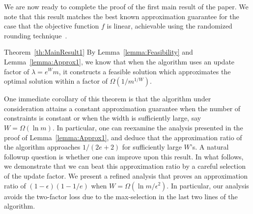 \documentclass[11pt]{article}
\theoremstyle{plain}
\theoremstyle{definition}
\begin{document}
We are now ready to complete the proof of the first main result of
the paper. We note that this result matches the best known
approximation guarantee for the case that the objective function
$f$ is linear, achievable using the randomized rounding
technique~\cite{RaghavanT87,Raghavan88,Srinivasan99}.

\begin{proofof}{Theorem~\ref{th:MainResult1}}
By Lemma~\ref{lemma:Feasibility} and Lemma~\ref{lemma:Approx1}, we
know that when the algorithm uses an update factor of $\lambda =
e^W m$, it constructs a feasible solution which approximates the
optimal solution within a factor of $\Omega(1 / m^{1/W})$.~
\end{proofof}

One immediate corollary of this theorem is that the algorithm
under consideration attains a constant approximation guarantee
when the number of constraints is constant or when the width is
sufficiently large, say $W = \Omega(\ln m)$. In particular, one
can reexamine the analysis presented in the proof of
Lemma~\ref{lemma:Approx1}, and deduce that the approximation ratio
of the algorithm approaches $1 / (2e + 2)$ for sufficiently large
$W$'s. A natural followup question is whether one can improve upon
this result. In what follows, we demonstrate that we can beat this
approximation ratio by a careful selection of the update factor.
We present a refined analysis that proves an approximation ratio
of $(1 - \epsilon)(1 - 1/e)$ when $W = \Omega(\ln m /
\epsilon^2)$. In particular, our analysis avoids the two-factor
loss due to the max-selection in the last two lines of the
algorithm.
\end{document}
